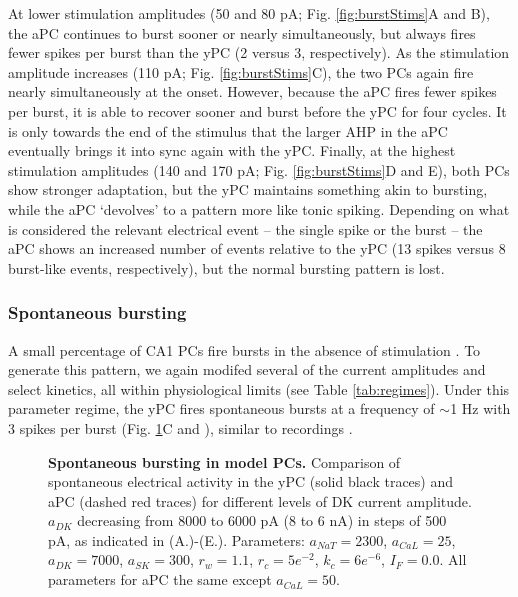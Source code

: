\documentclass[10pt,letterpaper]{article}
\begin{document}
At lower stimulation amplitudes (50 and 80 pA; Fig. \ref{fig:burstStims}A and B), the aPC continues to burst sooner or nearly simultaneously, but always fires fewer spikes per burst than the yPC (2 versus 3, respectively). As the stimulation amplitude increases (110 pA; Fig. \ref{fig:burstStims}C), the two PCs again fire nearly simultaneously at the onset. However, because the aPC fires fewer spikes per burst, it is able to recover sooner and burst before the yPC for four cycles. It is only towards the end of the stimulus that the larger AHP in the aPC eventually brings it into sync again with the yPC. Finally, at the highest stimulation amplitudes (140 and 170 pA; Fig. \ref{fig:burstStims}D and E), both PCs show stronger adaptation, but the yPC maintains something akin to bursting, while the aPC `devolves' to a pattern more like tonic spiking. Depending on what is considered the relevant electrical event -- the single spike or the burst -- the aPC shows an increased number of events relative to the yPC (13 spikes versus 8 burst-like events, respectively), but the normal bursting pattern is lost. 

\subsubsection*{Spontaneous bursting}
A small percentage of CA1 PCs fire bursts in the absence of stimulation \cite{jensen1994variant}. To generate this pattern, we again modifed several of the current amplitudes and select kinetics, all within physiological limits (see Table \ref{tab:regimes}). Under this parameter regime, the yPC fires spontaneous bursts at a frequency of $\sim$1 Hz with 3 spikes per burst (Fig. \ref{fig:burstingAging}C and ), similar to recordings \cite{golomb2006contribution}.

\begin{figure}[h!]
\centering
\caption{{\bf Spontaneous bursting in model PCs.}
Comparison of spontaneous electrical activity in the yPC (solid black traces) and aPC (dashed red traces) for different levels of DK current amplitude. $a_{DK}$ decreasing from 8000 to 6000 pA (8 to 6 nA) in steps of 500 pA, as indicated in (A.)-(E.). Parameters: $a_{NaT}=2300$, $a_{CaL}=25$, $a_{DK}=7000$, $a_{SK}=300$, $r_{w}=1.1$, $r_{c}=5e^{-2}$, $k_{c}=6e^{-6}$, $I_{F}=0.0$. All parameters for aPC the same except $a_{CaL}=50$.}
\label{fig:burstingAging}
\end{figure}
\end{document}
